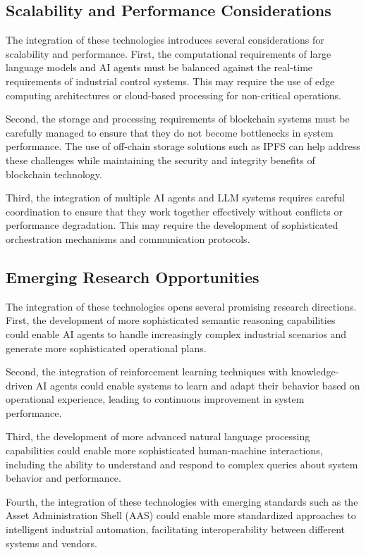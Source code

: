 \subsection{Scalability and Performance Considerations}

The integration of these technologies introduces several considerations for scalability and performance. First, the computational requirements of large language models and AI agents must be balanced against the real-time requirements of industrial control systems. This may require the use of edge computing architectures or cloud-based processing for non-critical operations.

Second, the storage and processing requirements of blockchain systems must be carefully managed to ensure that they do not become bottlenecks in system performance. The use of off-chain storage solutions such as IPFS can help address these challenges while maintaining the security and integrity benefits of blockchain technology.

Third, the integration of multiple AI agents and LLM systems requires careful coordination to ensure that they work together effectively without conflicts or performance degradation. This may require the development of sophisticated orchestration mechanisms and communication protocols.

\subsection{Emerging Research Opportunities}

The integration of these technologies opens several promising research directions. First, the development of more sophisticated semantic reasoning capabilities could enable AI agents to handle increasingly complex industrial scenarios and generate more sophisticated operational plans.

Second, the integration of reinforcement learning techniques with knowledge-driven AI agents could enable systems to learn and adapt their behavior based on operational experience, leading to continuous improvement in system performance.

Third, the development of more advanced natural language processing capabilities could enable more sophisticated human-machine interactions, including the ability to understand and respond to complex queries about system behavior and performance.

Fourth, the integration of these technologies with emerging standards such as the Asset Administration Shell (AAS) could enable more standardized approaches to intelligent industrial automation, facilitating interoperability between different systems and vendors.

